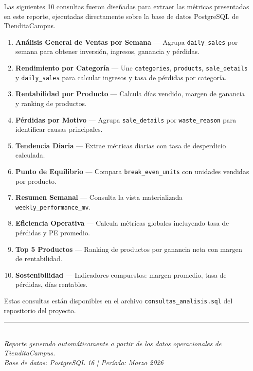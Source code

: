 \documentclass[12pt,letterpaper]{article}
\begin{document}
Las siguientes 10 consultas fueron diseñadas para extraer las métricas presentadas en este reporte, ejecutadas directamente sobre la base de datos PostgreSQL de TienditaCampus.

\begin{enumerate}[leftmargin=2em]
    \item \textbf{Análisis General de Ventas por Semana} --- Agrupa \texttt{daily\_sales} por semana para obtener inversión, ingresos, ganancia y pérdidas.
    \item \textbf{Rendimiento por Categoría} --- Une \texttt{categories}, \texttt{products}, \texttt{sale\_details} y \texttt{daily\_sales} para calcular ingresos y tasa de pérdidas por categoría.
    \item \textbf{Rentabilidad por Producto} --- Calcula días vendido, margen de ganancia y ranking de productos.
    \item \textbf{Pérdidas por Motivo} --- Agrupa \texttt{sale\_details} por \texttt{waste\_reason} para identificar causas principales.
    \item \textbf{Tendencia Diaria} --- Extrae métricas diarias con tasa de desperdicio calculada.
    \item \textbf{Punto de Equilibrio} --- Compara \texttt{break\_even\_units} con unidades vendidas por producto.
    \item \textbf{Resumen Semanal} --- Consulta la vista materializada \texttt{weekly\_performance\_mv}.
    \item \textbf{Eficiencia Operativa} --- Calcula métricas globales incluyendo tasa de pérdidas y PE promedio.
    \item \textbf{Top 5 Productos} --- Ranking de productos por ganancia neta con margen de rentabilidad.
    \item \textbf{Sostenibilidad} --- Indicadores compuestos: margen promedio, tasa de pérdidas, días rentables.
\end{enumerate}

Estas consultas están disponibles en el archivo \texttt{consultas\_analisis.sql} del repositorio del proyecto.

\vfill
\begin{center}
\rule{0.5\textwidth}{0.4pt}\\[0.3cm]
\textit{Reporte generado automáticamente a partir de los datos operacionales de TienditaCampus.}\\
\textit{Base de datos: PostgreSQL 16 | Período: Marzo 2026}
\end{center}
\end{document}
